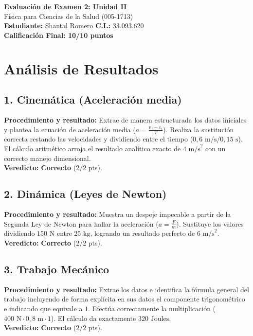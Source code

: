 \documentclass[12pt,letterpaper]{article}
\begin{document}
\begin{center}
    \Large \textbf{Evaluación de Examen 2: Unidad II} \\
    \large Física para Ciencias de la Salud (005-1713) \\
    \vspace{0.5cm}
    \textbf{Estudiante:} Shantal Romero \quad \textbf{C.I.:} 33.093.620
    \vspace{0.3cm} \\
    \large \textbf{Calificación Final: 10/10 puntos}
\end{center}

\vspace{0.5cm}

\section*{Análisis de Resultados}

\subsection*{1. Cinemática (Aceleración media)}
\textbf{Procedimiento y resultado:} Extrae de manera estructurada los datos iniciales y plantea la ecuación de aceleración media ($a = \frac{v_f - v_i}{T}$). Realiza la sustitución correcta restando las velocidades y dividiendo entre el tiempo ($0,6 \text{ m/s} / 0,15 \text{ s}$). El cálculo aritmético arroja el resultado analítico exacto de $4 \text{ m/s}^2$ con un correcto manejo dimensional. \\
\textbf{Veredicto:} \textbf{Correcto} (2/2 pts).

\subsection*{2. Dinámica (Leyes de Newton)}
\textbf{Procedimiento y resultado:} Muestra un despeje impecable a partir de la Segunda Ley de Newton para hallar la aceleración ($a = \frac{F}{m}$). Sustituye los valores dividiendo $150 \text{ N}$ entre $25 \text{ kg}$, logrando un resultado perfecto de $6 \text{ m/s}^2$. \\
\textbf{Veredicto:} \textbf{Correcto} (2/2 pts).

\subsection*{3. Trabajo Mecánico}
\textbf{Procedimiento y resultado:} Extrae los datos e identifica la fórmula general del trabajo incluyendo de forma explícita en sus datos el componente trigonométrico e indicando que equivale a $1$. Efectúa correctamente la multiplicación ($400 \text{ N} \cdot 0,8 \text{ m} \cdot 1$). El cálculo da exactamente $320 \text{ Joules}$. \\
\textbf{Veredicto:} \textbf{Correcto} (2/2 pts).
\end{document}
